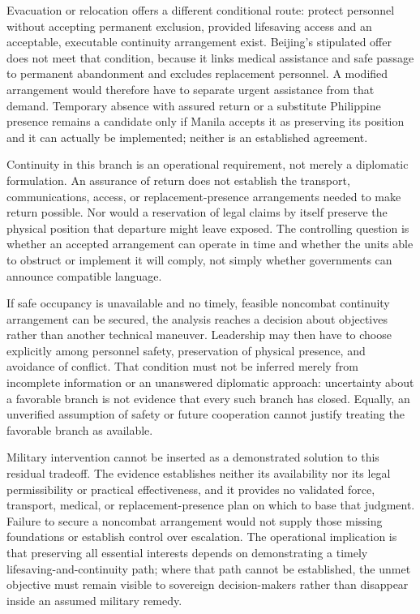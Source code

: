 \documentclass[11pt]{article}
\begin{document}
Evacuation or relocation offers a different conditional route: protect personnel without accepting permanent exclusion, provided lifesaving access and an acceptable, executable continuity arrangement exist. Beijing\textquoteright{}s stipulated offer does not meet that condition, because it links medical assistance and safe passage to permanent abandonment and excludes replacement personnel. A modified arrangement would therefore have to separate urgent assistance from that demand. Temporary absence with assured return or a substitute Philippine presence remains a candidate only if Manila accepts it as preserving its position and it can actually be implemented; neither is an established agreement.

Continuity in this branch is an operational requirement, not merely a diplomatic formulation. An assurance of return does not establish the transport, communications, access, or replacement-presence arrangements needed to make return possible. Nor would a reservation of legal claims by itself preserve the physical position that departure might leave exposed. The controlling question is whether an accepted arrangement can operate in time and whether the units able to obstruct or implement it will comply, not simply whether governments can announce compatible language.

If safe occupancy is unavailable and no timely, feasible noncombat continuity arrangement can be secured, the analysis reaches a decision about objectives rather than another technical maneuver. Leadership may then have to choose explicitly among personnel safety, preservation of physical presence, and avoidance of conflict. That condition must not be inferred merely from incomplete information or an unanswered diplomatic approach: uncertainty about a favorable branch is not evidence that every such branch has closed. Equally, an unverified assumption of safety or future cooperation cannot justify treating the favorable branch as available.

Military intervention cannot be inserted as a demonstrated solution to this residual tradeoff. The evidence establishes neither its availability nor its legal permissibility or practical effectiveness, and it provides no validated force, transport, medical, or replacement-presence plan on which to base that judgment. Failure to secure a noncombat arrangement would not supply those missing foundations or establish control over escalation. The operational implication is that preserving all essential interests depends on demonstrating a timely lifesaving-and-continuity path; where that path cannot be established, the unmet objective must remain visible to sovereign decision-makers rather than disappear inside an assumed military remedy.
\end{document}
